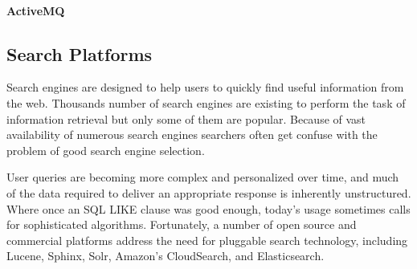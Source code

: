 \paragraph{ActiveMQ}
\subsection{Search Platforms \label{sec:back_se_en}}
Search engines are designed to help users to quickly find useful information from the web. Thousands number of search engines are existing to perform the task of information retrieval but only some of them are popular. Because of vast availability of numerous search engines searchers often get confuse with the problem of good search engine selection.

User queries are becoming more complex and personalized over time, and much of the data required to deliver an appropriate response is inherently unstructured. Where once an SQL LIKE clause was good enough, today's usage sometimes calls for sophisticated algorithms. Fortunately, a number of open source and commercial platforms address the need for pluggable search technology, including Lucene, Sphinx, Solr, Amazon's CloudSearch, and Elasticsearch.
